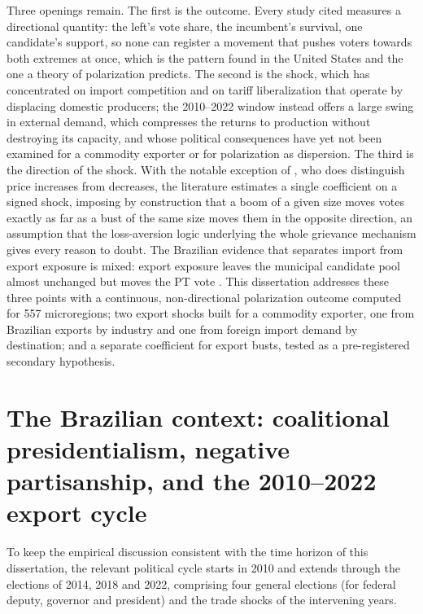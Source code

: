 \documentclass[
	11pt,				%
	oneside,			%
	a4paper,			%
	english,			%
	english				%
	]{abntex2ppgsi}
\theoremstyle{plain}
\theoremstyle{remark}
\theoremstyle{plain}%
\theoremstyle{remark}%
\begin{document}
Three openings remain. The first is the outcome. Every study cited measures a
directional quantity: the left's vote share, the incumbent's survival,
one candidate's support, so none can register a movement that pushes voters
towards both extremes at once, which is the pattern  found
in the United States and the one a theory of polarization predicts.
The second is the shock, which has concentrated on import
competition and on tariff liberalization that operate by displacing
domestic producers; the 2010--2022 window instead offers a large swing in
external demand, which compresses the returns to production without destroying
its capacity, and whose political consequences have yet not been examined for a commodity exporter or for polarization as dispersion. 
The third is the direction of the shock. With the notable exception of
, who does distinguish price increases from decreases, the
literature estimates a single coefficient on a signed shock, imposing by
construction that a boom of a given size moves votes exactly as far as a bust of the same size moves them in the opposite direction, an assumption that the
loss-aversion logic underlying the whole grievance mechanism gives every reason
to doubt. The Brazilian evidence that separates import from export exposure is mixed: export exposure leaves the municipal candidate pool almost unchanged \cite{costa2025} but moves the PT vote \cite{joneschina}.
This dissertation addresses these three points with a continuous, non-directional
polarization outcome computed for 557 microregions; two export shocks built for a
commodity exporter, one from Brazilian exports by industry and one from foreign
import demand by destination; and a separate coefficient for export busts, tested
as a pre-registered secondary hypothesis.



\section{The Brazilian context: coalitional presidentialism, negative partisanship, and the 2010--2022 export cycle}
\label{sec:brazilian-context}

To keep the empirical discussion consistent with the time horizon of this dissertation, the relevant political cycle starts in 2010 and extends through the elections of 2014, 2018 and 2022, comprising four general elections (for federal deputy, governor and president) and the trade shocks of the intervening years.
\end{document}

